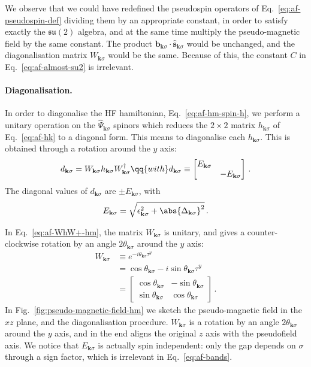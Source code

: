 We observe that we could have redefined the pseudospin operators of Eq.~\eqref{eq:af-pseudospin-def} dividing them by an appropriate constant, in order to satisfy exactly the $\mathfrak{su}(2)$ algebra, and at the same time multiply the pseudo-magnetic field by the same constant. The product $\mathbf{b}_{\mathbf{k}\sigma} \cdot \hat{\mathbf{s}}_{\mathbf{k}\sigma}$ would be unchanged, and the diagonalisation matrix $W_{\mathbf{k}\sigma}$ would be the same. Because of this, the constant $C$ in Eq.~\eqref{eq:af-almost-su2} is irrelevant.

\paragraph{Diagonalisation.}

In order to diagonalise the HF hamiltonian, Eq.~\eqref{eq:af-hm-spin-h}, we perform a unitary operation on the $\hat \Psi_{\mathbf{k}\sigma}$ spinors which reduces the $2 \times 2$ matrix $h_{\mathbf{k}\sigma}$ of Eq.~\eqref{eq:af-hk} to a diagonal form. This means to diagonalise each $h_{\mathbf{k}\sigma}$. This is obtained through a rotation around the $y$ axis:
\begin{equation}\label{eq:af-WhW+-hm}
	d_{\mathbf{k}\sigma} = W_{\mathbf{k}\sigma} h_{\mathbf{k}\sigma} W_{\mathbf{k}\sigma}^\dagger
	\qq{with}
	d_{\mathbf{k}\sigma} \equiv \begin{bmatrix}
		E_{\mathbf{k}\sigma} & \\
		& - E_{\mathbf{k}\sigma}
	\end{bmatrix} \, .
\end{equation}
The diagonal values of $d_{\mathbf{k}\sigma}$ are $\pm E_{\mathbf{k}\sigma}$, with
\begin{equation}\label{eq:af-bands}
	E_{\mathbf{k}\sigma} = \sqrt{
		\epsilon_{\mathbf{k}\sigma}^2 + \abs{\Delta_{\mathbf{k}\sigma}}^2
	} \, .
\end{equation}

In Eq.~\eqref{eq:af-WhW+-hm}, the matrix $W_{\mathbf{k}\sigma}$ is unitary, and gives a counter-clockwise rotation by an angle $2 \theta_{\mathbf{k}\sigma}$ around the $y$ axis:
\begin{align}
	W_{\mathbf{k}\sigma} &\equiv e^{-i \theta_{\mathbf{k}\sigma} \tau^y} \nonumber\\
	&= \cos \theta_{\mathbf{k}\sigma} -i \sin \theta_{\mathbf{k}\sigma} \tau^y \nonumber\\
	&= \begin{bmatrix}
		\cos \theta_{\mathbf{k}\sigma} & - \sin \theta_{\mathbf{k}\sigma} \\
		\sin \theta_{\mathbf{k}\sigma} & \cos \theta_{\mathbf{k}\sigma}
	\end{bmatrix} \, . \label{eq:af-hm-diagonalizer}
\end{align}
In Fig.~\ref{fig:pseudo-magnetic-field-hm} we sketch the pseudo-magnetic field in the $xz$ plane, and the diagonalisation procedure. $W_{\mathbf{k}\sigma}$ is a rotation by an angle $2\theta_{\mathbf{k}\sigma}$ around the $y$ axis, and in the end aligns the original $z$ axis with the pseudofield axis. We notice that $E_{\mathbf{k}\sigma}$ is actually spin independent: only the gap depends on $\sigma$ through a sign factor, which is irrelevant in Eq.~\eqref{eq:af-bands}.

